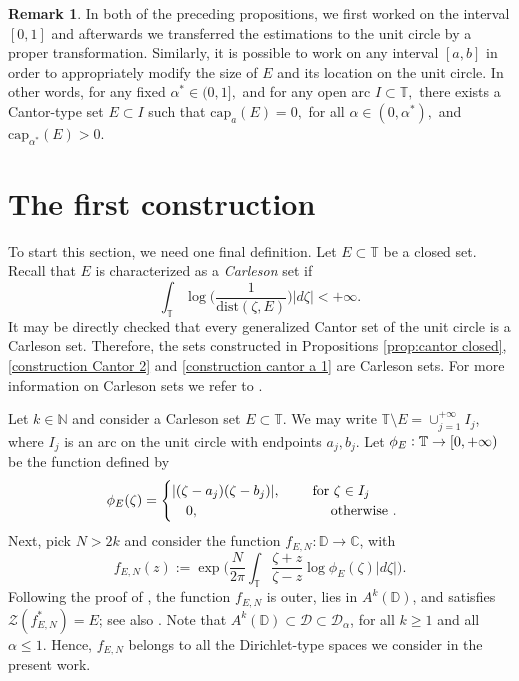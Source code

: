 \documentclass[12pt]{amsart}
\theoremstyle{definition}\newtheorem{remark}[theorem]{Remark}
\theoremstyle{definition}\newtheorem{example}[theorem]{Example}
\theoremstyle{definition}\newtheorem{definition}{Definition}
\numberwithin{equation}{section}
\newcommand\cD{{\mathcal D}}
\newcommand\CC{{\mathbb C}}
\newcommand\DD{{\mathbb D}}
\newcommand\TT{{\mathbb T}}
\begin{document}
\begin{remark}\label{remark location of cantor}
In both of the preceding propositions, we first worked on the interval $[0,1]$ and afterwards we transferred the estimations to the unit circle by a proper transformation.  Similarly, it is possible to work on any interval $[a,b]$ in order to appropriately modify the size of $E$ and its location on the unit circle. In other words, for any fixed $\alpha^*\in (0,1],$ and for any open arc $I\subset \TT,$ there exists a Cantor-type set $E\subset I$ such that $\mathrm{cap}_a(E)=0,$ for all $\alpha\in (0,\alpha^*),$ and $\mathrm{cap}_{\alpha^*}(E)>0.$
\end{remark}


\section{The first construction}
To start this section, we need one final definition. Let $E\subset \TT$ be a closed set. Recall that $E$ is characterized as a \textit{Carleson} set if
\begin{equation*}
    \int_{\TT}\log\Big(\frac{1}{\mathrm{dist}(\zeta,E)}\Big)|d\zeta|<+\infty.
\end{equation*}
It may be directly checked that every generalized Cantor set of the unit circle is a Carleson set. Therefore, the sets constructed in Propositions \ref{prop:cantor closed}, \ref{construction Cantor 2} and \ref{construction cantor a 1} are Carleson sets. For more information on Carleson sets we refer to \cite[Section 4.4]{Primer}.

Let $k\in \mathbb{N}$ and consider a Carleson set $E\subset \TT$. We may write $\TT\setminus E=\cup_{j=1}^{+\infty} I_j$, where $I_j$ is an arc on the unit circle with endpoints $a_j,b_j$. Let $\phi_E\vcentcolon\TT\to [0,+\infty)$ be the function defined by
\begin{equation}\label{eq:phi outer}
\phi_E(\zeta)=
\begin{cases}
    |(\zeta-a_j)(\zeta-b_j)|, \quad\quad\hspace{0.1cm}\text{for }\zeta\in I_j\\
    \quad 0, \hspace{3.33cm}\text{otherwise }.
\end{cases}
\end{equation}
Next, pick $N>2k$ and consider the function $f_{E,N}:\DD\rightarrow \CC$, with
\begin{equation}\label{eq: f outer}
f_{E,N}(z):=\exp\Big(\frac{N}{2\pi}\int_{\TT}\frac{\zeta+z}{\zeta-z}\log\phi_E(\zeta)|d\zeta|\Big).
\end{equation}
Following the proof of \cite[Theorem 4.4.3]{Primer}, the function $f_{E,N}$ is outer, lies in $A^k(\DD)$, and satisfies $\mathcal{Z}(f_{E,N}^*)=E$; see also \cite{Carleson}. Note that $A^k(\DD)\subset \mathcal{D}\subset \cD_\alpha$, for all $k\geq 1$ and all $\alpha\leq 1$. Hence, $f_{E,N}$ belongs to all the Dirichlet-type spaces we consider in the present work. 
\end{document}
